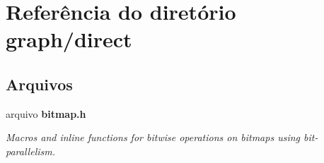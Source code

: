 \section{Referência do diretório graph/direct}
\label{dir_2dc63ba1922dd3c937d48b548a786867}
\subsection*{Arquivos}
\begin{DoxyCompactItemize}
\item 
arquivo {\bf bitmap.\+h}
\begin{DoxyCompactList}\small\item\em Macros and inline functions for bitwise operations on bitmaps using bit-\/parallelism. \end{DoxyCompactList}\end{DoxyCompactItemize}
